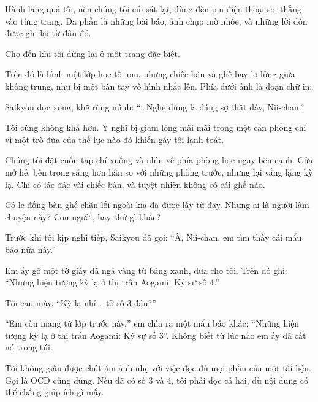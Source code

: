 \documentclass[../main.tex]{subfiles}
\begin{document}
Hành lang quá tối, nên chúng tôi cúi sát lại, dùng đèn pin điện thoại soi thẳng vào từng trang. Đa phần là những bài báo, ảnh chụp mờ nhòe, và những lời đồn được ghi lại từ đâu đó.

Cho đến khi tôi dừng lại ở một trang đặc biệt.

Trên đó là hình một lớp học tối om, những chiếc bàn và ghế bay lơ lửng giữa không trung, như bị một bàn tay vô hình nhấc lên. Phía dưới ảnh là đoạn chữ in:


Saikyou đọc xong, khẽ rùng mình: ``\dots Nghe đúng là đáng sợ thật đấy, Nii-chan.''

Tôi cũng không khá hơn. Ý nghĩ bị giam lỏng mãi mãi trong một căn phòng chỉ vì một trò đùa của thế lực nào đó khiến gáy tôi lạnh toát.

Chúng tôi đặt cuốn tạp chí xuống và nhìn về phía phòng học ngay bên cạnh. Cửa mở hé, bên trong sáng hơn hẳn so với những phòng trước, nhưng lại vắng lặng kỳ lạ. Chỉ có lác đác vài chiếc bàn, và tuyệt nhiên không có cái ghế nào.

Có lẽ đống bàn ghế chặn lối ngoài kia đã được lấy từ đây. Nhưng ai là người làm chuyện này? Con người, hay thứ gì khác?

Trước khi tôi kịp nghĩ tiếp, Saikyou đã gọi: ``À, Nii-chan, em tìm thấy cái mẩu báo nữa này.''

Em ấy gỡ một tờ giấy đã ngả vàng từ bảng xanh, đưa cho tôi. Trên đó ghi: ``{\vnmsans Những hiện tượng kỳ lạ ở thị trấn Aogami: Ký sự số 4}.''

Tôi cau mày. ``Kỳ lạ nhỉ\dots\ tờ số 3 đâu?''

``Em còn mang từ lớp trước này,'' em chìa ra một mẩu báo khác: ``{\vnmsans Những hiện tượng kỳ lạ ở thị trấn Aogami: Ký sự số 3}''. Không biết từ lúc nào em ấy đã cất nó trong túi.

Tôi không giấu được chút ám ảnh nhẹ với việc đọc đủ mọi phần của một tài liệu. Gọi là OCD cũng đúng. Nếu đã có số 3 và 4, tôi phải đọc cả hai, dù nội dung có thể chẳng giúp ích gì mấy.
\end{document}
